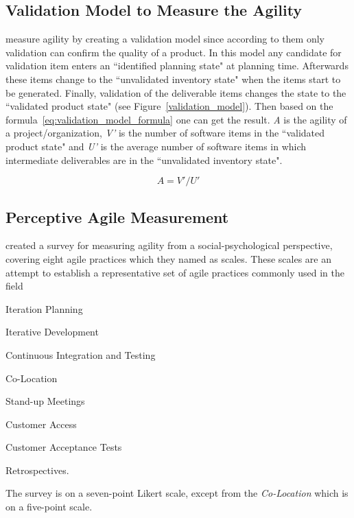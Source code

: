 \subsection{Validation Model to Measure the Agility}
\citet{validation_model} measure agility by creating a validation model since according to them only validation can confirm the quality of a product. In this model any candidate for validation item enters an ``identified planning state" at planning time. Afterwards these items change to the ``unvalidated inventory state" when the items start to be generated. Finally, validation of the deliverable items changes the state to the ``validated product state" (see Figure~\ref{validation_model}). Then based on the formula~\eqref{eq:validation_model_formula} one can get the result. \textit{A} is the agility of a project/organization, \textit{V'} is the number of software items in the ``validated product state" and \textit{U'} is the average number of software items in which intermediate deliverables are in the ``unvalidated inventory state".

\begin{equation} \label{eq:validation_model_formula}  A = V'/U' \end{equation}

\subsection{Perceptive Agile Measurement}
\citet{pam} created a survey for measuring agility from a social-psychological perspective, covering eight agile practices which they named as scales. These scales are an attempt to establish a representative set of agile practices commonly used in the field

\begin{inparaenum} [a\upshape)]
\item Iteration Planning
\item Iterative Development
\item Continuous Integration and Testing
\item Co-Location
\item Stand-up Meetings
\item Customer Access
\item Customer Acceptance Tests
\item Retrospectives.
\end{inparaenum} The survey is on a seven-point Likert scale, except from the \textit{Co-Location} which is on a five-point scale.

